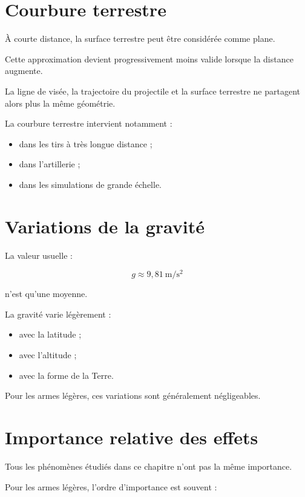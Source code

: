 \section{Courbure terrestre}

À courte distance, la surface terrestre peut être considérée comme plane.

Cette approximation devient progressivement moins valide lorsque la distance
augmente.

La ligne de visée, la trajectoire du projectile et la surface terrestre ne
partagent alors plus la même géométrie.

La courbure terrestre intervient notamment :

\begin{itemize}
    \item dans les tirs à très longue distance ;
    \item dans l'artillerie ;
    \item dans les simulations de grande échelle.
\end{itemize}

\section{Variations de la gravité}

La valeur usuelle :

\begin{equation}
g \approx 9,81~\mathrm{m/s^2}
\end{equation}

n'est qu'une moyenne.

La gravité varie légèrement :

\begin{itemize}
    \item avec la latitude ;
    \item avec l'altitude ;
    \item avec la forme de la Terre.
\end{itemize}

Pour les armes légères, ces variations sont généralement négligeables.

\section{Importance relative des effets}

Tous les phénomènes étudiés dans ce chapitre n'ont pas la même importance.

Pour les armes légères, l'ordre d'importance est souvent :


